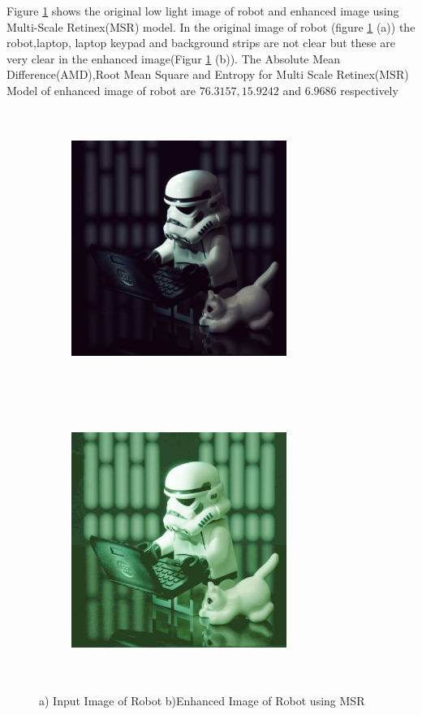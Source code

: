 Figure \ref{fig:msrRobot} shows the original low light image of robot and enhanced image using Multi-Scale Retinex(MSR) model. In the original image of robot (figure \ref{fig:msrRobot} (a))  the robot,laptop, laptop keypad and background strips are not clear but these are very clear in the enhanced image(Figur \ref{fig:msrRobot} (b)). The Absolute Mean Difference(AMD),Root Mean Square and Entropy for Multi Scale Retinex(MSR) Model of enhanced image of robot are $76.3157, 15.9242$ and $6.9686$ respectively      


\begin{figure}[!htb]
	\begin{subfigure}{8cm}
		\centering    
    	\includegraphics[width=7cm,height=9cm,keepaspectratio]{images/ch5/robot_input.jpg}
    	\caption{} 
    \end{subfigure}
  	\begin{subfigure}{6cm}
  		\centering
  		\includegraphics[width=7cm,height=9cm,keepaspectratio]{images/ch5/robot_msr.jpg}
   		\caption{}
  	\end{subfigure}
  	\caption{a) Input Image of Robot b)Enhanced Image of Robot using MSR}
  	\label{fig:msrRobot}
\end{figure}

